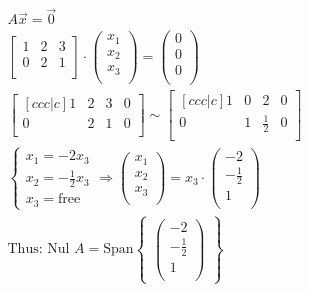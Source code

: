 \documentclass[11pt, a4paper]{article}
\begin{document}
\begin{gather*}
  A\vec{x} = \vec{0}\\
  \begin{bmatrix} 1 & 2 & 3\\ 0 & 2 & 1\\ \end{bmatrix}
    \cdot
  \begin{pmatrix} x_1 \\ x_2 \\ x_3\\ \end{pmatrix}
    =
  \begin{pmatrix} 0 \\ 0 \\ 0\\ \end{pmatrix}\\
  \begin{bmatrix}[ccc|c]
    1 & 2 & 3 & 0\\
    0 & 2 & 1 & 0\\
  \end{bmatrix}
  \sim
  \begin{bmatrix}[ccc|c]
    1 & 0 & 2 & 0\\
    0 & 1 & \frac{1}{2} & 0\\
  \end{bmatrix}\\
  \begin{cases}
    x_1 = -2x_3\\
    x_2 = -\frac{1}{2}x_3\\
    x_3 = \text{free}
  \end{cases}
  \Rightarrow
  \begin{pmatrix} x_1 \\ x_2 \\ x_3\\ \end{pmatrix}
    =
    x_3 \cdot \begin{pmatrix} -2 \\ -\frac{1}{2} \\ 1\\ \end{pmatrix}\\
  \text{Thus: } \text{Nul } A = \text{Span} \begin{Bmatrix} \begin{pmatrix} -2 \\ -\frac{1}{2} \\ 1\\ \end{pmatrix} \end{Bmatrix}
\end{gather*}
\end{document}
